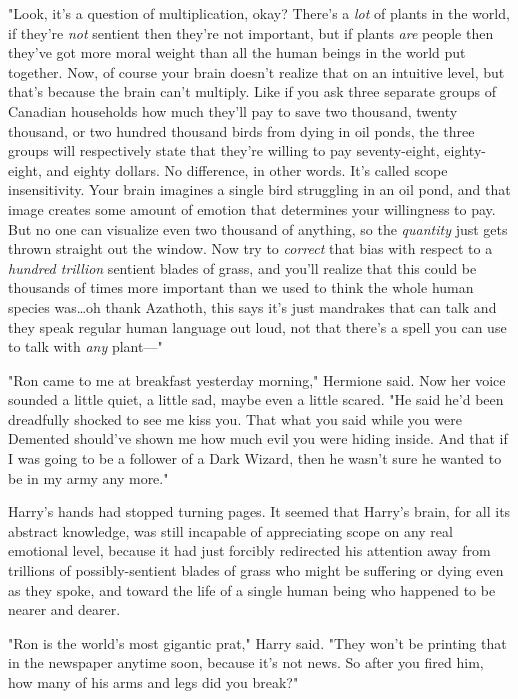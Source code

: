 "Look, it’s a question of multiplication, okay? There’s a \emph{lot} of plants
in the world, if they’re \emph{not} sentient then they’re not important, but if
plants \emph{are} people then they’ve got more moral weight than all the human
beings in the world put together. Now, of course your brain doesn’t realize
that on an intuitive level, but that’s because the brain can’t multiply. Like
if you ask three separate groups of Canadian households how much they’ll pay to
save two thousand, twenty thousand, or two hundred thousand birds from dying in
oil ponds, the three groups will respectively state that they’re willing to pay
seventy-eight, eighty-eight, and eighty dollars. No difference, in other words.
It’s called scope insensitivity. Your brain imagines a single bird struggling
in an oil pond, and that image creates some amount of emotion that determines
your willingness to pay. But no one can visualize even two thousand of
anything, so the \emph{quantity} just gets thrown straight out the window. Now
try to \emph{correct} that bias with respect to a \emph{hundred trillion}
sentient blades of grass, and you’ll realize that this could be thousands of
times more important than we used to think the whole human species was…oh
thank Azathoth, this says it’s just mandrakes that can talk and they speak
regular human language out loud, not that there’s a spell you can use to talk
with \emph{any} plant—"

"Ron came to me at breakfast yesterday morning," Hermione said. Now her voice
sounded a little quiet, a little sad, maybe even a little scared. "He said he’d
been dreadfully shocked to see me kiss you. That what you said while you were
Demented should’ve shown me how much evil you were hiding inside. And that if I
was going to be a follower of a Dark Wizard, then he wasn’t sure he wanted to
be in my army any more."

Harry’s hands had stopped turning pages. It seemed that Harry’s brain, for all
its abstract knowledge, was still incapable of appreciating scope on any real
emotional level, because it had just forcibly redirected his attention away
from trillions of possibly-sentient blades of grass who might be suffering or
dying even as they spoke, and toward the life of a single human being who
happened to be nearer and dearer.

"Ron is the world’s most gigantic prat," Harry said. "They won’t be printing
that in the newspaper anytime soon, because it’s not news. So after you fired
him, how many of his arms and legs did you break?"

